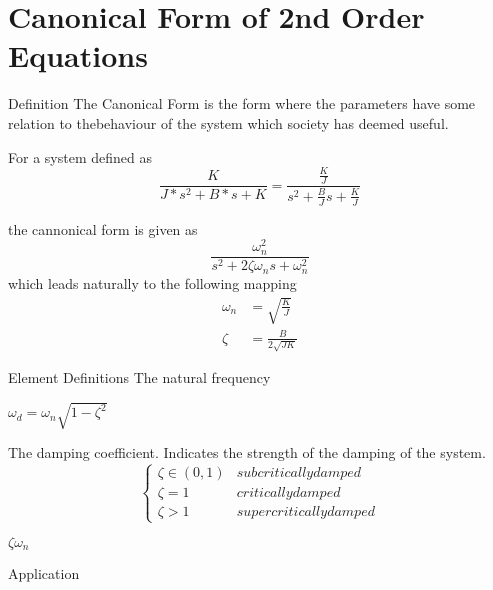 \documentclass{../templates/topic}
\begin{document}
\chapter{Canonical Form of 2nd Order Equations}

\begin{section}{Definition}
	The Canonical Form is the form where the parameters have some relation to thebehaviour of the system which society has deemed useful.
	
	For a system defined as
	\begin{equation}
		\frac{K}{J*s^2+B*s+K}=\frac{\frac{K}{J}}{s^2+\frac{B}{J}s+\frac{K}{J}}
	\end{equation}
	
	the cannonical form is given as
	\begin{equation}
		\frac{\omega_n^2}{s^2+2\zeta\omega_n s + \omega_n^2}
	\end{equation}
	which leads naturally to the following mapping
	\begin{align}
		\omega_n &= \sqrt{\frac{K}{J}}\\
		\zeta &= \frac{B}{2\sqrt{JK}}
	\end{align}
	
\end{section}

\begin{section}{Element Definitions}
	 The natural frequency
	
	 $\omega_d=\omega_n\sqrt{1-\zeta^2}$
	
	 The damping coefficient. Indicates the strength of the damping of the system.
	\begin{equation*}
		\begin{cases}
			\zeta \in (0,1) & subcritically damped \\
			\zeta = 1 & critically damped \\
			\zeta > 1 & supercritically damped
		\end{cases}
	\end{equation*}
	
	 $\zeta\omega_n$
\end{section}

\begin{section}{Application}
\end{section}
\end{document}

